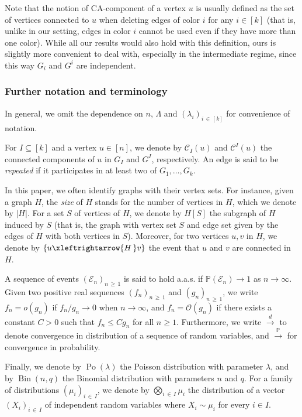 \documentclass[AHL,Unicode,longabstracts,published]{cedram}
\renewcommand{\Pr}{\mathbb{P}}
\newcommand{\cO}{\mathcal{O}}
\newcommand{\cC}{\mathcal{C}}
\newcommand{\cE}{\mathcal{E}}
\DeclareMathOperator{\rPo}{Po}
\DeclareMathOperator{\rBin}{Bin}
\begin{document}
\begin{rema}
Note that the notion of CA-component of a vertex $u$ is usually defined as the set of vertices connected to $u$ when deleting edges of color $i$ for any $i\in [k]$ (that is, unlike in our setting, edges in color $i$ cannot be used even if they have more than one color). While all our results would also hold with this definition, ours is slightly more convenient to deal with, especially in the intermediate regime, since this way $G_i$ and $G^i$ are independent.
\end{rema}

\subsubsection*{Further notation and terminology}
In general, we omit the dependence on $n$, $\Lambda$ and $(\lambda_i)_{i\,\in\,[k]}$ for convenience of notation.


For $I\subseteq [k]$ and a vertex $u\in [n]$, we denote by $\cC_I(u)$ and $\cC^I(u)$ the connected components of $u$ in $G_I$ and $G^I$, respectively. An edge is said to be \emph{repeated} if it participates in at least two of $G_1, \ldots, G_k$.


In this paper, we often identify graphs with their vertex sets. For instance, given a graph $H$, the \emph{size} of $H$ stands for the number of vertices in $H$, which we denote by $|H|$. For a set $S$ of vertices of $H$, we denote by $H[S]$ the subgraph of $H$ induced by $S$ (that is, the graph with vertex set $S$ and edge set given by the edges of $H$ with both vertices in $S$). Moreover, for two vertices $u,v$ in $H$, we denote by $\{u\xleftrightarrow{H\,} v\}$ the event that $u$ and $v$ are connected in $H$.

A sequence of events $(\cE_n)_{n\,\ge\,1}$ is said to hold a.a.s. if $\Pr(\cE_n)\to 1$ as $n\to \infty$. Given two positive real sequences $(f_n)_{n\,\ge\,1}$ and $(g_n)_{n\,\ge\,1}$, we write $f_n=o(g_n)$ if $f_n/g_n\to 0$ when $n\to\infty$, and $f_n=\cO(g_n)$ if there exists a constant $C>0$ such that $f_n\le Cg_n$ for all $n\ge 1$. Furthermore, we write $\xrightarrow{d}$ to denote convergence in distribution of a sequence of random variables, and $\xrightarrow{\Pr}$ for convergence in probability.

Finally, we denote by $\rPo(\lambda)$ the Poisson distribution with parameter $\lambda$, and by $\rBin(n,q)$ the Binomial distribution with parameters $n$ and $q$. For a family of distributions $(\mu_i)_{i\,\in\,I}$, we denote by $\bigotimes_{i\,\in\,I} \mu_i$ the distribution of a vector $(X_i)_{i\,\in\,I}$ of independent random variables where $X_i\sim \mu_i$ for every $i\in I$.
\end{document}
